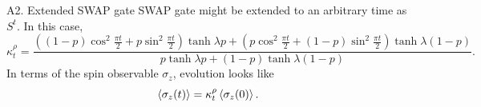 \begin{frame}{A2. Extended SWAP gate}
    SWAP gate might be extended to an arbitrary time as $S^{t}$. In this case, 
    \begin{equation*}
        \kappa_{t}^{\rho}=\frac{((1-p)\cos^{2}{\frac{\pi t}{2}}+p\sin^{2}{\frac{\pi t}{2}})\tanh{\lambda p}+(p\cos^{2}{\frac{\pi t}{2}}+(1-p)\sin^{2}{\frac{\pi t}{2}})\tanh{\lambda (1-p)}}{
          p\tanh{\lambda p}+(1-p)\tanh{\lambda (1-p)}}.
      \end{equation*}
      In terms of the spin observable $\sigma_{z}$, evolution looks like
\begin{equation}
  \expval{\sigma_{z}(t)}=\kappa_{t}^{\rho}\expval{\sigma_{z}(0)}.
\end{equation}
\end{frame}
